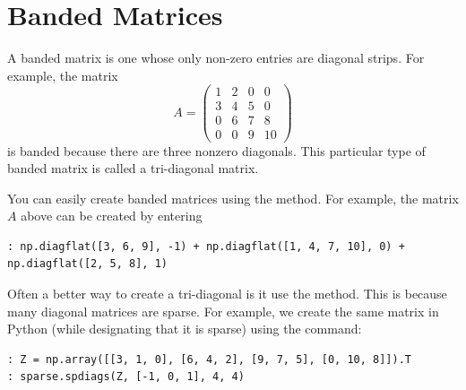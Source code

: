 \section*{Banded Matrices}
A banded matrix is one whose only non-zero entries are diagonal
strips.  For example, the matrix
\begin{equation*}
A = \begin{pmatrix} 
1 & 2 & 0 & 0 \\
3 & 4 & 5 & 0 \\
0 & 6 & 7 & 8 \\
0 & 0 & 9 & 10
\end{pmatrix}
\end{equation*}
is banded because there are three nonzero diagonals.  This
particular type of banded matrix is called a tri-diagonal matrix.

You can easily create banded matrices using the  method.
For example, the matrix $A$ above can be created by entering
\begin{lstlisting}
: np.diagflat([3, 6, 9], -1) + np.diagflat([1, 4, 7, 10], 0) + np.diagflat([2, 5, 8], 1)
\end{lstlisting}

Often a better way to create a tri-diagonal is it use the  method. 
This is because many diagonal matrices are sparse. 
For example, we create the same matrix in Python (while designating that it is sparse) using the command:
\begin{lstlisting}
: Z = np.array([[3, 1, 0], [6, 4, 2], [9, 7, 5], [0, 10, 8]]).T
: sparse.spdiags(Z, [-1, 0, 1], 4, 4)
\end{lstlisting}

